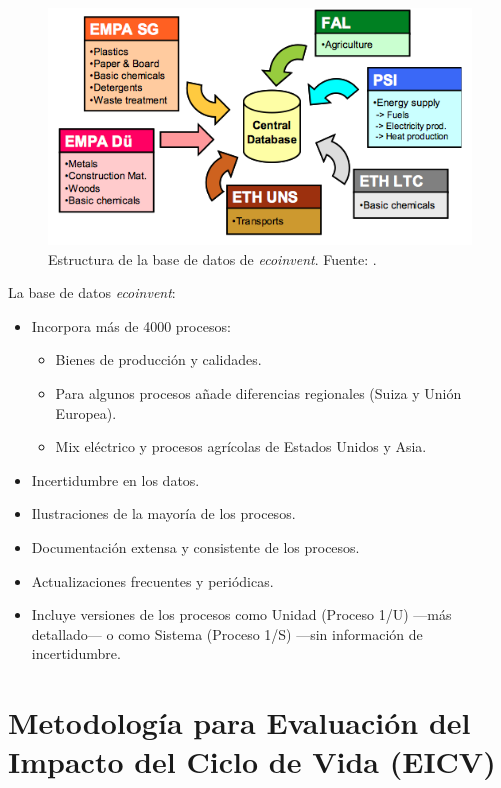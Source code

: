 \begin{figure}[!htb]
\centering
\includegraphics[width=13cm]{img/bbddecoinvent.png}
\caption[Estructura de la base de datos de \textit{ecoinvent}.]{Estructura de la base de datos de \textit{ecoinvent}. Fuente: \protect\cite{mgoedkoop2}.}
\label{fig:bbddecoinvent}
\end{figure}

La base de datos \textit{ecoinvent}:
\begin{itemize}
  \item Incorpora más de 4000 procesos:
  \begin{itemize}
    \item Bienes de producción y calidades.
    \item Para algunos procesos añade diferencias regionales (Suiza y Unión Europea).
    \item Mix eléctrico y procesos agrícolas de Estados Unidos y Asia.
  \end{itemize}
  \item Incertidumbre en los datos.
  \item Ilustraciones de la mayoría de los procesos.
  \item Documentación extensa y consistente de los procesos.
  \item Actualizaciones frecuentes y periódicas.
  \item Incluye versiones de los procesos como Unidad (Proceso 1/U) —más detallado— o como Sistema (Proceso 1/S) —sin información de incertidumbre.
\end{itemize}

\section{Metodología para Evaluación del Impacto del Ciclo de Vida (EICV)}\label{sec:metodologiaeicv}

